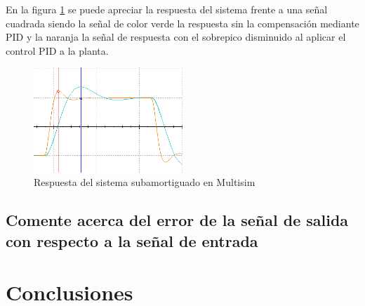 \documentclass[conference]{IEEEtran}
\begin{document}
	En la figura \ref{fig:sub-sobrepico-simulado} se puede apreciar la respuesta del sistema frente a una señal cuadrada siendo la señal de color verde la respuesta sin la compensación mediante PID y la naranja la señal de respuesta con el sobrepico disminuido al aplicar el control PID a la planta.
	\begin{figure}[h]
		\centering
		\includegraphics[width=0.5\textwidth]{media/sub-sobrepico-simulado}
		\caption{Respuesta del sistema subamortiguado en Multisim}
		\label{fig:sub-sobrepico-simulado}
	\end{figure}
	
	
	
	\subsection{\textbf{Comente acerca del error de la señal de salida con respecto a la señal de entrada}}
	
	\section{Conclusiones}
	
	
	
\end{document}
